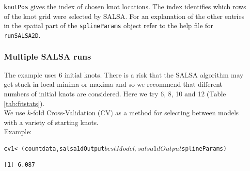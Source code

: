 {\tt knotPos} gives the index of chosen knot locations.  The index identifies which rows of the knot grid were selected by SALSA.  For an explanation of the other entries in the spatial part of the {\tt splineParams} object refer to the help file for {\tt runSALSA2D}.

\begin{frame}[fragile]
\frametitle{Multiple SALSA runs}

\noindent The example uses 6 initial knots.  There is a risk that the SALSA algorithm may get stuck in local minima or maxima and so we recommend that different numbers of initial knots are considered.  Here we try 6, 8, 10 and 12 (Table \ref{tab:fitstats}).  \\

\noindent We use $k$-fold Cross-Validation (CV) as a method for selecting between models with a variety of starting knots.\\

\noindent Example:
\begin{knitrout}\footnotesize
{}\color{fgcolor}
\end{knitrout}

\begin{knitrout}\footnotesize
{}\color{fgcolor}\begin{kframe}
\begin{alltt}
cv1 <- (countdata, salsa1dOutput$bestModel, 
           salsa1dOutput$splineParams)
\end{alltt}
\begin{verbatim}
[1] 6.087
\end{verbatim}
\end{kframe}
\end{knitrout}

\end{frame}

